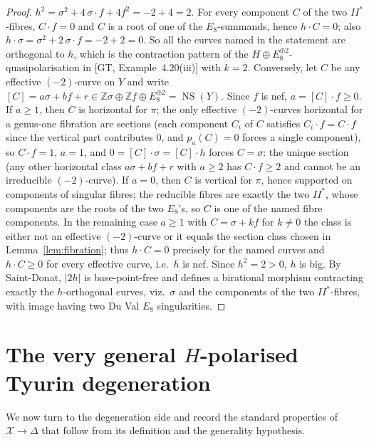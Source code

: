 \documentclass[11pt]{article}
\newcommand{\X}{\mathcal{X}}
\newcommand{\D}{\Delta}
\newcommand{\bZ}{\mathbb{Z}}
\DeclareMathOperator{\NS}{NS}
\begin{document}
\begin{proof}
$h^2=\sigma^2+4\,\sigma\cdot f + 4f^2=-2+4=2$. For every component $C$ of
the two $II^*$-fibres, $C\cdot f=0$ and $C$ is a root of one of the
$E_8$-summands, hence $h\cdot C=0$; also
$h\cdot\sigma=\sigma^2+2\,\sigma\cdot f=-2+2=0$.
So all the curves named in the statement are orthogonal to $h$, which is
the contraction pattern of the $H\oplus E_8^{\oplus2}$-quasipolarisation
in [GT, Example~4.20(iii)] with $k=2$. Conversely, let $C$ be any
effective $(-2)$-curve on $Y$ and write
$[C]=a\sigma+bf+r\in \bZ\sigma\oplus\bZ f\oplus E_8^{\oplus2}=\NS(Y)$.
Since $f$ is nef, $a=[C]\cdot f\ge0$. If $a\ge1$, then $C$ is horizontal
for $\pi$; the only effective $(-2)$-curves horizontal for a genus-one
fibration are sections (each component $C_i$ of $C$ satisfies
$C_i\cdot f=C\cdot f$ since the vertical part contributes $0$, and
$p_a(C)=0$ forces a single component), so $C\cdot f=1$, $a=1$, and
$0=[C]\cdot\sigma=[C]\cdot h$ forces $C=\sigma$: the unique section
(any other horizontal class $a\sigma+bf+r$ with $a\ge2$ has
$C\cdot f\ge2$ and cannot be an irreducible $(-2)$-curve). If $a=0$,
then $C$ is vertical for $\pi$, hence supported on components of
singular fibres; the reducible fibres are exactly the two $II^*$, whose
components are the roots of the two $E_8$'s, so $C$ is one of the named
fibre components. In the remaining case $a\ge1$ with $C=\sigma+kf$ for
$k\neq0$ the class is either not an effective $(-2)$-curve or it equals
the section class chosen in Lemma~\ref{lem:fibration}; thus
$h\cdot C=0$ precisely for the named curves and $h\cdot C\ge 0$
for every effective curve, i.e.\ $h$ is nef. Since $h^2=2>0$, $h$ is big.
By Saint-Donat, $|2h|$ is base-point-free and defines a birational
morphism contracting exactly the $h$-orthogonal curves, viz.\ $\sigma$ and
the components of the two $II^*$-fibres, with image having two Du Val
$E_8$ singularities.
\end{proof}

\section{The very general \texorpdfstring{$H$}{H}-polarised Tyurin
degeneration}\label{sec:degeneration}


We now turn to the degeneration side and record the standard properties of
$\X\to\D$ that follow from its definition and the generality hypothesis.
\end{document}
